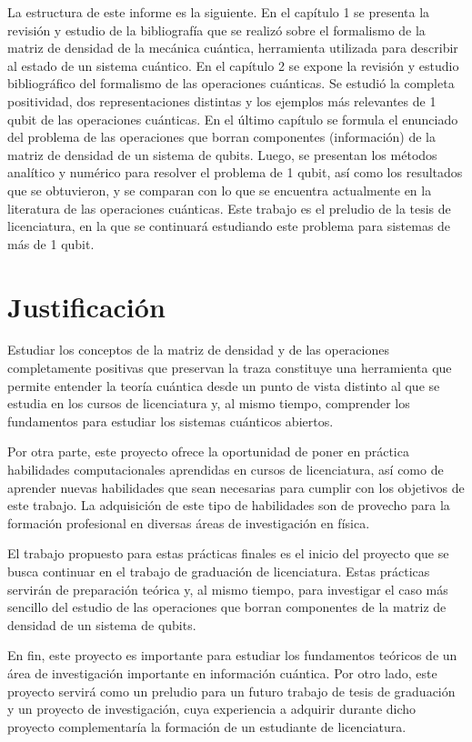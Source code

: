 La estructura de este informe es la siguiente. En el capítulo 1
se presenta la revisión y estudio de la bibliografía que se realizó 
sobre el formalismo de la matriz de densidad de la mecánica cuántica, 
herramienta utilizada para describir 
al estado de un sistema cuántico. En el capítulo 2 se expone 
la revisión y estudio bibliográfico del formalismo de las 
operaciones cuánticas. Se estudió la completa positividad, 
dos representaciones distintas y los ejemplos más relevantes 
de 1 qubit de las operaciones cuánticas. En el último capítulo
se formula el enunciado del problema de las operaciones que borran 
componentes (información) de la matriz de densidad de un sistema de 
qubits. Luego, se presentan los métodos analítico y numérico 
para resolver el problema de 1 qubit, así como los resultados 
que se obtuvieron, y se comparan con lo que se encuentra actualmente
en la literatura de las operaciones cuánticas. Este trabajo 
es el preludio de la tesis de licenciatura, en la que se continuará 
estudiando este problema para sistemas de más de 1 qubit.


\section*{Justificación}
Estudiar los conceptos de la matriz de densidad y de las operaciones completamente
positivas que preservan la traza constituye una herramienta que permite 
entender la teoría cuántica desde un punto de vista distinto al que se estudia
en los cursos de licenciatura y, al mismo tiempo, comprender los fundamentos 
para estudiar los sistemas cuánticos abiertos. 

Por otra parte, este proyecto ofrece la oportunidad de poner en práctica habilidades
computacionales aprendidas en cursos de licenciatura, así como de 
aprender nuevas habilidades que sean necesarias para cumplir con los objetivos
de este trabajo. La adquisición de este tipo de habilidades son de provecho para la formación 
profesional en diversas áreas de investigación en física. 

El trabajo propuesto para estas prácticas finales es el inicio del proyecto
que se busca continuar en el trabajo de graduación de licenciatura. 
Estas prácticas servirán de preparación teórica y, al mismo tiempo, 
para investigar el caso más sencillo del estudio de las operaciones 
que borran componentes de la matriz de densidad de un sistema 
de qubits.

En fin, este proyecto es importante para estudiar los fundamentos teóricos
de un área de investigación importante en información cuántica. 
Por otro lado, este proyecto servirá como un preludio para un futuro trabajo de
tesis de graduación y un proyecto de investigación, cuya experiencia a adquirir durante
dicho proyecto complementaría la formación de un estudiante de licenciatura. 


